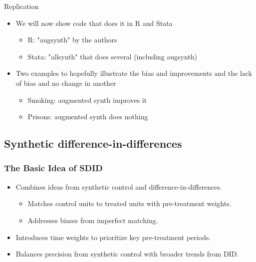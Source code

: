 \documentclass{beamer}
\begin{document}
\begin{frame}{Replication}

\begin{itemize}
\item We will now show code that does it in R and Stata
	\begin{itemize}
	\item R: "augsynth" by the authors
	\item Stata: "allsynth" that does several (including augsynth)
	\end{itemize}
\item Two examples to hopefully illustrate the bias and improvements and the lack of bias and no change in another
	\begin{itemize}
	\item Smoking: augmented synth improves it
	\item Prisons: augmented synth does nothing
	\end{itemize}
\end{itemize}

\end{frame}






\subsection{Synthetic difference-in-differences}

\begin{frame}
\frametitle{The Basic Idea of SDID}

\begin{itemize}
    \item Combines ideas from synthetic control and difference-in-differences.
        \begin{itemize}
            \item Matches control units to treated units with pre-treatment weights.
            \item Addresses biases from imperfect matching.
        \end{itemize}
    \item Introduces time weights to prioritize key pre-treatment periods.
    \item Balances precision from synthetic control with broader trends from DID.
\end{itemize}

\end{frame}
\end{document}
